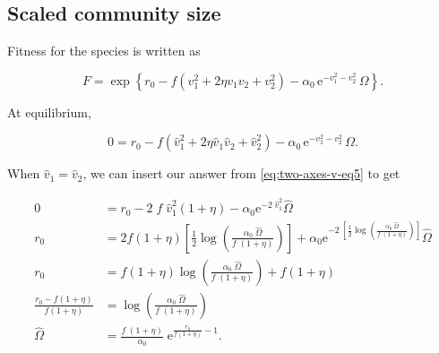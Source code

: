 






\subsection*{Scaled community size}

Fitness for the species is written as

$$
    F = \exp \left\{
        r_0 - f ( {v}_{1}^2 + 2 \eta {v}_{1} {v}_{2} + {v}_{2}^2 ) -
        \alpha_0 \, \textrm{e}^{ - {v}_{1}^2 - {v}_{2}^2 } \, \Omega
    \right\}
    \textrm{.}
$$


\noindent At equilibrium,

\begin{equation}
    0 = r_0 - f ( \hat{v}_{1}^2 + 2 \eta \hat{v}_{1} \hat{v}_{2} + \hat{v}_{2}^2 ) -
        \alpha_0 \, \textrm{e}^{ - {v}_{1}^2 - {v}_{2}^2 } \, \Omega
    \textrm{.}
\label{eq:two-axes-omega-equil-start}
\end{equation}


\noindent When $\hat{v}_1 = \hat{v}_2$, we can insert our answer from
\ref{eq:two-axes-v-eq5} to get

\begin{equation*}
\begin{split}
    0 &= r_0 - 2 \; f \; \hat{v}_{1}^2 ( 1 + \eta ) -
        \alpha_0 \textrm{e}^{ -2 \; \hat{v}_{1}^2 } \hat{\Omega} \\
    r_0 &= 2 f ( 1 + \eta ) \left[
        \frac{1}{2}
        \log \left( \frac{ \alpha_0 \; \hat{\Omega} }{ f \; ( 1 + \eta ) } \right)
    \right] +
        \alpha_0 \textrm{e}^{ -2 \;
            \left[
                \frac{1}{2} \log \left(
                    \frac{ \alpha_0 \; \hat{\Omega} }{ f \; ( 1 + \eta ) }
                \right)
            \right]
        } \hat{\Omega} \\
    r_0 &= f ( 1 + \eta ) \log \left(
        \frac{ \alpha_0 \; \hat{\Omega} }{ f \; ( 1 + \eta ) }
    \right) + f ( 1 + \eta ) \\
    \frac{  r_0 - f ( 1 + \eta ) }{ f ( 1 + \eta ) } &=
        \log \left(
        \frac{ \alpha_0 \; \hat{\Omega} }{ f \; ( 1 + \eta ) }
        \right) \\
    \hat{\Omega} &= \frac{ f \; ( 1 + \eta ) }{ \alpha_0 } \;
        \textrm{e}^{\frac{  r_0 }{ f ( 1 + \eta ) } - 1 }
    \textrm{.}
\end{split}
\end{equation*}

